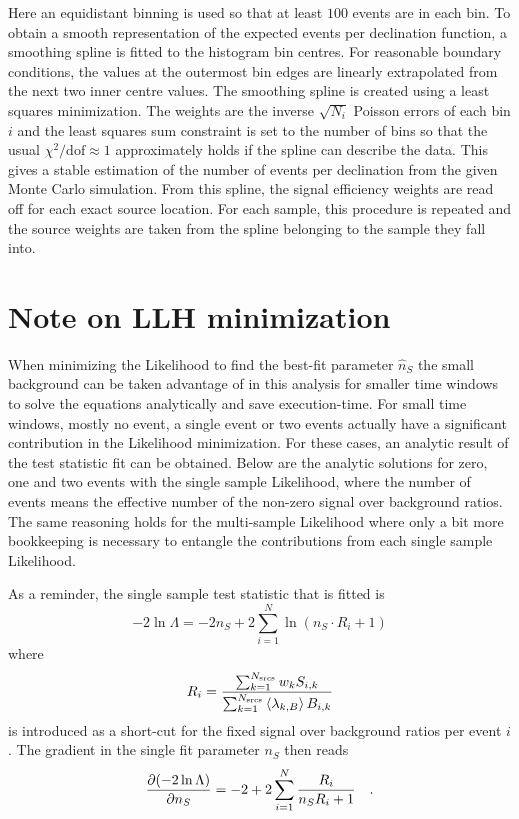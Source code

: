 Here an equidistant binning is used so that at least $100$ events are in each bin.
To obtain a smooth representation of the expected events per declination function, a smoothing spline is fitted to the histogram bin centres.
For reasonable boundary conditions, the values at the outermost bin edges are linearly extrapolated from the next two inner centre values.
The smoothing spline is created using a least squares minimization.
The weights are the inverse $\sqrt{N_i}$ Poisson errors of each bin $i$ and the least squares sum constraint is set to the number of bins so that the usual $\chi^2 / \text{dof} \approx 1$ approximately holds if the spline can describe the data.
This gives a stable estimation of the number of events per declination from the given Monte Carlo simulation.
From this spline, the signal efficiency weights are read off for each exact source location.
For each sample, this procedure is repeated and the source weights are taken from the spline belonging to the sample they fall into.


\section{Note on LLH minimization}
When minimizing the Likelihood to find the best-fit parameter $\hat{n}_S$ the small background can be taken advantage of in this analysis for smaller time windows to solve the equations analytically and save execution-time.
For small time windows, mostly no event, a single event or two events actually have a significant contribution in the Likelihood minimization.
For these cases, an analytic result of the test statistic fit can be obtained.
Below are the analytic solutions for zero, one and two events with the single sample Likelihood, where the number of events means the effective number of the non-zero signal over background ratios.
The same reasoning holds for the multi-sample Likelihood where only a bit more bookkeeping is necessary to entangle the contributions from each single sample Likelihood.

As a reminder, the single sample test statistic that is fitted is
\begin{equation}
  -2\ln\Lambda
  = -2n_S + 2\sum_{i=1}^N \ln\left(n_S \cdot R_i + 1\right)
\end{equation}
where
\begin{equation}
  R_i = \frac{\sum_{k=1}^{N_\text{srcs}} w_k S_{i,k}}
             {\sum_{k=1}^{N_\text{srcs}}\Braket{\lambda_{k,B}} B_{i,k}}
\end{equation}
is introduced as a short-cut for the fixed signal over background ratios per event $i$.
The gradient in the single fit parameter $n_S$ then reads
\begin{equation}
  \frac{\partial (-2\ln\Lambda)}{\partial n_S}
  = -2 + 2\sum_{i=1}^N \frac{R_i}{n_S R_i + 1}
  \quad\text{.}
\end{equation}

